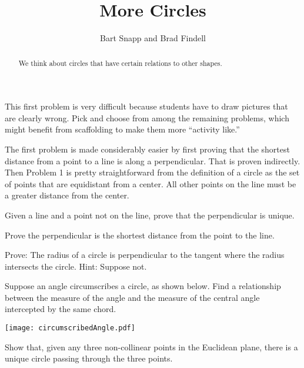 \documentclass[nooutcomes]{ximera}
\title{More Circles}
\author{Bart Snapp and Brad Findell}
\begin{document}
\begin{abstract}
  We think about circles that have certain relations to other shapes.
\end{abstract}
\maketitle

\begin{teachingnote}
This first problem is very difficult because students have to draw pictures that are clearly wrong.  Pick and choose from among the remaining problems, which might benefit from scaffolding to make them more ``activity like.''

The first problem is made considerably easier by first proving that the shortest distance from a point to a line is along a perpendicular.  That is proven indirectly.  Then Problem 1 is pretty straightforward from the definition of a circle as the set of points that are equidistant from a center.  All other points on the line must be a greater distance from the center.
\end{teachingnote}

\begin{problem}
Given a line and a point not on the line, prove that the perpendicular is unique. 

Prove the perpendicular is the shortest distance from the point to the line.  

\end{problem}

\begin{problem}
Prove: The radius of a circle is perpendicular to the tangent where the radius intersects the circle.  Hint:  Suppose not. 
\vfill
\end{problem}

\begin{problem}
Suppose an angle circumscribes a circle, as shown below.  Find a relationship between the measure of the angle and the measure of the central angle intercepted by the same chord.
\begin{image}
\texttt{[image: circumscribedAngle.pdf]}
\end{image}
\vfill
\end{problem}

\newpage

\begin{problem}
Show that, given any three non-collinear points in the Euclidean
plane, there is a unique circle passing through the three points.
\vfill
\end{problem}
\end{document}
